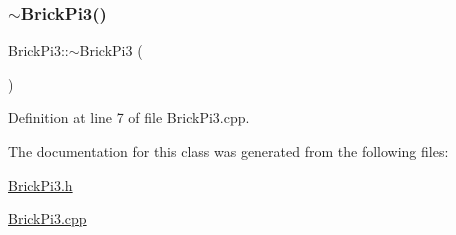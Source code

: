 \subsubsection{\texorpdfstring{$\sim$\+Brick\+Pi3()}{~BrickPi3()}}
{\footnotesize\ttfamily Brick\+Pi3\+::$\sim$\+Brick\+Pi3 (\begin{DoxyParamCaption}{ }\end{DoxyParamCaption})}



Definition at line 7 of file Brick\+Pi3.\+cpp.



The documentation for this class was generated from the following files\+:\begin{DoxyCompactItemize}
\item 
\mbox{\hyperlink{_brick_pi3_8h}{Brick\+Pi3.\+h}}\item 
\mbox{\hyperlink{_brick_pi3_8cpp}{Brick\+Pi3.\+cpp}}\end{DoxyCompactItemize}
